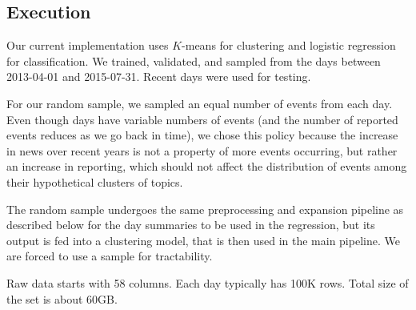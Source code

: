 \subsection{Execution}

Our current implementation uses $K$-means for clustering and logistic regression for classification. We trained, validated, and sampled from the days between 2013-04-01 and 2015-07-31. Recent days were used for testing.

For our random sample, we sampled an equal number of events from each day. Even though days have variable numbers of events (and the number of reported events reduces as we go back in time), we chose this policy because the increase in news over recent years is not a property of more events occurring, but rather an increase in reporting, which should not affect the distribution of events among their hypothetical clusters of topics.

The random sample undergoes the same preprocessing and expansion pipeline as described below for the day summaries to be used in the regression, but its output is fed into a clustering model, that is then used in the main pipeline. We are forced to use a sample for tractability.

Raw data starts with 58 columns. Each day typically has 100K rows. Total size of the set is about 60GB. %

